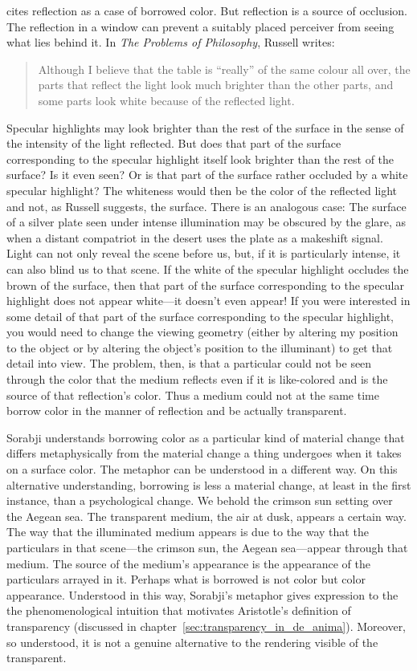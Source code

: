 \citet{Sorabji:2004fk} cites reflection as a case of borrowed color. But reflection is a source of occlusion. The reflection in a window can prevent a suitably placed perceiver from seeing what lies behind it. In \emph{The Problems of Philosophy}, Russell writes:
	\begin{quote}
		Although I believe that the table is ``really'' of the same colour all over, the parts that reflect the light look much brighter than the other parts, and some parts look white because of the reflected light. \citep[2]{Russell:1912uq}
	\end{quote}
Specular highlights may look brighter than the rest of the surface in the sense of the intensity of the light reflected. But does that part of the surface corresponding to the specular highlight itself look brighter than the rest of the surface? Is it even seen? Or is that part of the surface rather occluded by a white specular highlight? The whiteness would then be the color of the reflected light and not, as Russell suggests, the surface. There is an analogous case: The surface of a silver plate seen under intense illumination may be obscured by the glare, as when a distant compatriot in the desert uses the plate as a makeshift signal. Light can not only reveal the scene before us, but, if it is particularly intense, it can also blind us to that scene. If the white of the specular highlight occludes the brown of the surface, then that part of the surface corresponding to the specular highlight does not appear white---it doesn't even appear! If you were interested in some detail of that part of the surface corresponding to the specular highlight, you would need to change the viewing geometry (either by altering my position to the object or by altering the object's position to the illuminant) to get that detail into view. The problem, then, is that a particular could not be seen through the color that the medium reflects even if it is like-colored and is the source of that reflection's color. Thus a medium could not at the same time borrow color in the manner of reflection and be actually transparent.

Sorabji understands borrowing color as a particular kind of material change that differs metaphysically from the material change a thing undergoes when it takes on a surface color. The metaphor can be understood in a different way. On this alternative understanding, borrowing is less a material change, at least in the first instance, than a psychological change. We behold the crimson sun setting over the Aegean sea. The transparent medium, the air at dusk, appears a certain way. The way that the illuminated medium appears is due to the way that the particulars in that scene---the crimson sun, the Aegean sea---appear through that medium. The source of the medium's appearance is the appearance of the particulars arrayed in it. Perhaps what is borrowed is not color but color appearance. Understood in this way, Sorabji's metaphor gives expression to the the phenomenological intuition that motivates Aristotle's definition of transparency (discussed in chapter~\ref{sec:transparency_in_de_anima}). Moreover, so understood, it is not a genuine alternative to the rendering visible of the transparent.

